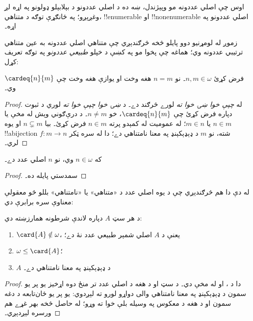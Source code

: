 \documentclass[../../../include/open-logic-section]{subfiles}
\begin{document}

اوس چې اصلي عددونه مو وپېژندل، ښه ده د اصلي عددونو د بېلابېلو
ډولونو په اړه لږ وغږېږو؛ په ځانګړې توګه د متناهي،
!!{enumerable} او !!{nonenumerable} اصلي عددونو په اړه۔

زموږ له لومړنيو دوو پايلو څخه څرګندېږي چې متناهي اصلي عددونه به
عين متناهي ترتيبي عددونه وي؛ هماغه چې پخوا مو په
 کښې د خپلو \emph{طبيعي
عددونو} په توګه تعريف کړل:

\begin{prop}
فرض کړئ $n, m \in \omega$۔ نو $n = m$ هغه وخت او يوازې هغه وخت
چې $\cardeq{n}{m}$ وي۔
\end{prop}

\begin{proof}
له \emph{چپې خوا ښۍ خوا ته} لورے څرګند دے۔ د \emph{ښۍ خوا
چپې خوا ته} لوري د ثبوت دپاره فرض کړئ چې $\cardeq{n}{m}$، خو
$n \neq m$۔ د درې‌ګوني وېش له مخې يا $n \in m$ يا $m \in n$؛
له عموميت له کمېدو پرته $n \in m$ فرض کړئ۔ بيا $n \subsetneq m$
او يوه !!a{bijection} $f \colon m \to n$ شته، نو $m$ د
ډېډېکېنډ په معنا نامتناهي دے؛ دا له
 سره ټکر لري۔
\end{proof}

\begin{cor}
که $n \in \omega$ وي، نو $n$ اصلي عدد دے۔
\end{cor}

\begin{proof}
سمدستي پايله ده۔
\end{proof}
\noindent
له دې دا هم څرګندېږي چې د يوه اصلي عدد د «متناهي» يا
«نامتناهي» بللو څو معقولې معناوې سره برابرې دي:
\begin{thm}د هر سټ $A$ دپاره لاندې
شرطونه همارزښته دي:
\begin{enumerate}
	\item{} $\card{A} \notin \omega$، يعنې
	د $A$ اصلي شمېر طبيعي عدد نۀ دے؛
	\item{} $\omega \leq \card{A}$؛
	\item{} $A$ د ډېډېکېنډ په معنا نامتناهي دے۔
\end{enumerate}
\end{thm}

\begin{proof}
دا د ،
 او
 له مخې دي۔ د سټ او د هغه د
اصلي عدد تر منځ دوه اړخيز يو پر يو سمون د ډېډېکېنډ په معنا
نامتناهي والى دواړو لورو ته لېږدوي: يو پر يو ځان‌تابعه د
دغه سمون او د هغه د معکوس په وسيله بلې خوا ته وړو؛ له
حاصل څخه بهر غړے هم ورسره لېږدېږي۔
\end{proof}
\end{document}
